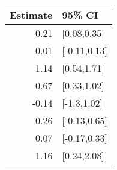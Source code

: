 \begin{tabular}{rl}
  \hline
Estimate & 95\% CI \\ 
  \hline
0.21 & [0.08,0.35] \\ 
  0.01 & [-0.11,0.13] \\ 
  1.14 & [0.54,1.71] \\ 
  0.67 & [0.33,1.02] \\ 
  -0.14 & [-1.3,1.02] \\ 
  0.26 & [-0.13,0.65] \\ 
  0.07 & [-0.17,0.33] \\ 
  1.16 & [0.24,2.08] \\ 
   \hline
\end{tabular}

